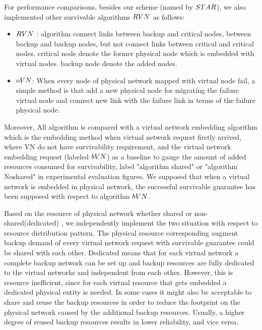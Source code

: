For performance comparisons, besides our scheme (named by $STAR$), we also implemented other survivable algorithms $RVN$ \cite{yeow2011designing} as follows:
\begin{itemize}
  \item $RVN$ : algorithm connect links between backup and critical nodes, between backup and backup nodes, but not connect links between critical and critical nodes. critical node denote the former physical node which is embedded with virtual nodes. backup node denote the added nodes.
  \item $oVN$: When every node of physical network mapped with virtual node fail, a simple method is that add a new  physical node for migrating the failure virtual node and connect new link with the failure link in terms of the failure physical node.
\end{itemize}

Moreover, All algorithm is  compared with a virtual network embedding algorithm\cite{liu2011completing} which is the embedding method when virtual network request firstly arrived, where VN do not have survivability requirement, and the virtual network embedding request (labeled $bVN$) as a baseline to gauge the amount of added resources consumed for survivability, label "algorithm shared" or "algorithm Noshared" in experimental evaluation figures. We supposed that when a virtual network is embedded in physical network, the successful survivable guarantee has been supposed  with respect to algorithm $bVN$.

Based on the resource of physical network whether shared or non-shared(dedicated) \cite{lu2006efficient}, we independently implement the two situation with respect to resource distribution pattern. The physical resource corresponding augment backup demand of  every virtual network request with survivable guarantee  could be shared with each other. Dedicated means that for each virtual network a
complete backup network can be set up and backup resources are fully dedicated to the virtual networks and independent from each other. However, this is resource inefficient, since for each virtual resource that gets embedded a dedicated physical entity is needed. In some cases it might also be acceptable to share and reuse the backup resources in order to reduce the footprint on the physical network caused by the additional
backup resources. Usually, a higher degree of reused backup resources results in lower reliability, and vice versa.

